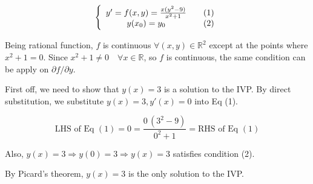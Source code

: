 \begin{solution}
    \[
\left\{
\begin{array}{cc}
 y' = f(x,y) = \frac{x(y^2 - 9)}{x^2 + 1} & \quad \refstepcounter{equation}(1)\\
 y(x_0) = y_0 & \quad \refstepcounter{equation}(2)
\end{array}
\right.
\]

Being rational function, $f$ is continuous $\forall (x, y) \in \mathbb{R}^2$ except at the points 
where $x^2 + 1 = 0$. Since $x^2 + 1 \neq 0 \quad \forall x \in \mathbb{R}$, so $f$ is 
continuous, the same condition can be apply on $\partial f / \partial y$.

First off, we need to show that  $y(x) = 3$ is a solution to the IVP. 
By direct substitution, we substitute $y(x) = 3, y'(x) = 0$ into Eq (1).

\[
    \text{LHS of Eq } (1) = 0 = \frac{0\,(3^2 - 9)}{0^2 + 1} = \text{RHS of Eq }(1)
\]

Also, $y(x) = 3 \Rightarrow y(0) = 3 \Rightarrow y(x) = 3$ satisfies condition (2).

By Picard's theorem, $y(x) = 3$ is the only solution to the IVP.


\end{solution}